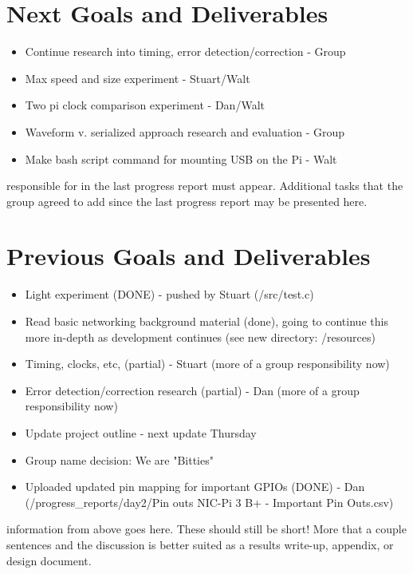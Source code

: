 \documentclass{article}
\begin{document}
\section*{Next Goals and Deliverables}
\begin{itemize}
\item Continue research into timing, error detection/correction - Group
\item Max speed and size experiment - Stuart/Walt
\item Two pi clock comparison experiment - Dan/Walt
\item Waveform v. serialized approach research and evaluation - Group
\item Make bash script command for mounting USB on the Pi - Walt
\end{itemize}

responsible for in the last progress report must appear. Additional tasks that the
group agreed to add since the last progress report may be presented here.
\section*{Previous Goals and Deliverables}
\begin{itemize}
    \item Light experiment (DONE) - pushed by Stuart (/src/test.c)
    \item Read basic networking background material (done), going to continue this more in-depth as development continues (see new directory: /resources)
    \item Timing, clocks, etc, (partial) - Stuart (more of a group responsibility now) 
    \item Error detection/correction research (partial) - Dan (more of a group responsibility now)
    \item Update project outline - next update Thursday
    \item Group name decision: We are "Bitties"
    \item Uploaded updated pin mapping for important GPIOs (DONE) - Dan (/progress_reports/day2/Pin outs NIC-Pi 3 B+ - Important Pin Outs.csv)
\end{itemize}

information from above goes here. These should still be short! More that a couple
sentences and the discussion is better suited as a results write-up, appendix, or
design document.
\end{document}

